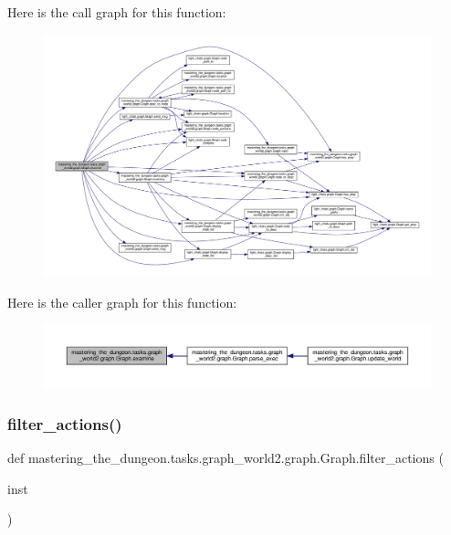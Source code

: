 Here is the call graph for this function\+:
\nopagebreak
\begin{figure}[H]
\begin{center}
\leavevmode
\includegraphics[width=350pt]{classmastering__the__dungeon_1_1tasks_1_1graph__world2_1_1graph_1_1Graph_a305d2db72903f116e864dbe6c0005cdf_cgraph}
\end{center}
\end{figure}
Here is the caller graph for this function\+:
\nopagebreak
\begin{figure}[H]
\begin{center}
\leavevmode
\includegraphics[width=350pt]{classmastering__the__dungeon_1_1tasks_1_1graph__world2_1_1graph_1_1Graph_a305d2db72903f116e864dbe6c0005cdf_icgraph}
\end{center}
\end{figure}
\mbox{\label{classmastering__the__dungeon_1_1tasks_1_1graph__world2_1_1graph_1_1Graph_a965e5cb857d2d1660404b61f5525d8ba}} 
\subsubsection{\texorpdfstring{filter\+\_\+actions()}{filter\_actions()}}
{\footnotesize\ttfamily def mastering\+\_\+the\+\_\+dungeon.\+tasks.\+graph\+\_\+world2.\+graph.\+Graph.\+filter\+\_\+actions (\begin{DoxyParamCaption}\item[{}]{inst }\end{DoxyParamCaption})\hspace{0.3cm}{\ttfamily [static]}}



